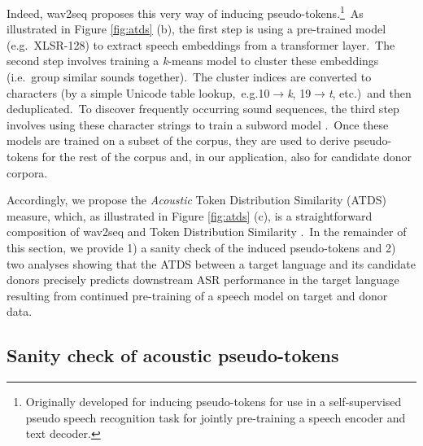 \documentclass[main.tex]{subfiles}
\begin{document}
Indeed, wav2seq proposes this very way of inducing pseudo-tokens.\footnote{Originally developed for inducing pseudo-tokens for use in a self-supervised pseudo speech recognition task for jointly pre-training a speech encoder and text decoder.}~As illustrated in Figure \ref{fig:atds} (b), the first step is using a pre-trained model (e.g.~XLSR-128) to extract speech embeddings from a transformer layer.~The second step involves training a \textit{k}-means model to cluster these embeddings (i.e.~group similar sounds together).~The cluster indices are converted to characters (by a simple Unicode table lookup,~e.g.10$ \rightarrow $\textit{k}, 19$\rightarrow$\textit{t}, etc.)~and then deduplicated.~To discover frequently occurring sound sequences, the third step involves using these character strings to train a subword model \parencite[e.g.~via sentencepiece:][]{kudo2018sentencepiece}.~Once these models are trained on a subset of the corpus, they are used to derive pseudo-tokens for the rest of the corpus and, in our application, also for candidate donor corpora.

Accordingly, we propose the \textit{Acoustic} Token Distribution Similarity (ATDS) measure, which, as illustrated in Figure \ref{fig:atds} (c), is a straightforward composition of wav2seq \parencite{10096988} and Token Distribution Similarity \parencite[TDS:][]{gogoulou2023study}.~In the remainder of this section, we provide 1) a sanity check of the induced pseudo-tokens and 2) two analyses showing that the ATDS between a target language and its candidate donors precisely predicts downstream ASR performance in the target language resulting from continued pre-training of a speech model on target and donor data.

\subsection{Sanity check of acoustic pseudo-tokens}

\end{document}
